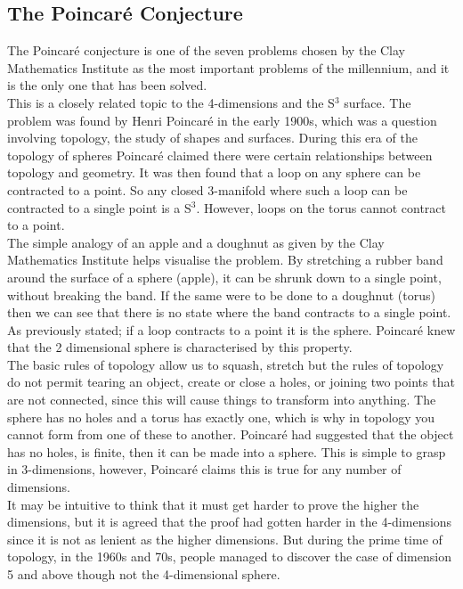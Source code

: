 \documentclass[12pt]{article} %
\begin{document}
\begin{flushleft}
\subsection{The Poincar\'e Conjecture} %
The Poincar\'e conjecture is one of the seven problems chosen by the Clay Mathematics Institute as the most important problems of the millennium, and it is the only one that has been solved.\\
This is a closely related topic to the 4-dimensions and the S$^{3}$  surface. The problem was found by Henri Poincar\'e in the early 1900s, which was a question involving topology, the study of shapes and surfaces. During this era of the topology of spheres Poincar\'e claimed there were certain relationships between topology and geometry. It was then found that a loop on any sphere can be contracted to a point. So any closed 3-manifold where such a loop can be contracted to a single point is a S$^{3}$. However, loops on the torus cannot contract to a point.\\
The simple analogy of an apple and a doughnut as given by the Clay Mathematics Institute \cite{clay:pc} helps visualise the problem. By stretching a rubber band around the surface of a sphere (apple), it can be shrunk down to a single point, without breaking the band. If the same were to be done to a doughnut (torus) then we can see that there is no state where the band contracts to a single point. As previously stated; if a loop contracts to a point it is the sphere. Poincar\'e knew that the 2 dimensional sphere is characterised by this property.\\

The basic rules of topology allow us to squash, stretch but the rules of topology do not permit tearing an object, create or close a holes, or joining two points that are not connected, since this will cause things to transform into anything. The sphere has no holes and a torus has exactly one, which is why in topology you cannot form from one of these to another. Poincar\'e had suggested that the object has no holes, is finite, then it can be made into a sphere. This is simple to grasp in 3-dimensions, however, Poincar\'e claims this is true for any number of dimensions.\\

It may be intuitive to think that it must get harder to prove the higher the dimensions, but it is agreed that the proof had gotten harder in the 4-dimensions since it is not as lenient as the higher dimensions. But during the prime time of topology, in the 1960s and 70s, people managed to discover the case of dimension 5 and above though not the 4-dimensional sphere.\\


\end{flushleft}
\end{document}
